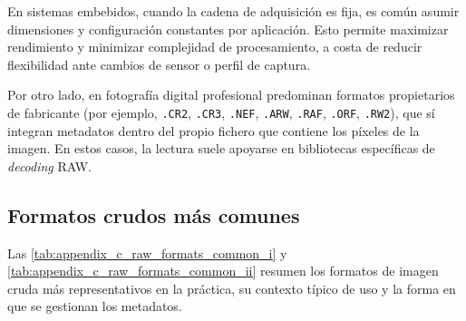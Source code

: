 En sistemas embebidos, cuando la cadena de adquisición es fija, es común
asumir dimensiones y configuración constantes por aplicación. Esto permite
maximizar rendimiento y minimizar complejidad de procesamiento, a costa de reducir
flexibilidad ante cambios de sensor o perfil de captura.

Por otro lado, en fotografía digital profesional predominan formatos propietarios
de fabricante (por ejemplo, \texttt{.CR2}, \texttt{.CR3}, \texttt{.NEF},
\texttt{.ARW}, \texttt{.RAF}, \texttt{.ORF}, \texttt{.RW2}), que sí integran
metadatos dentro del propio fichero que contiene los píxeles de la imagen. 
En estos casos, la lectura suele apoyarse en bibliotecas específicas de \textit{decoding} RAW.

\newpage

\subsection{Formatos crudos más comunes}

Las \autoref{tab:appendix_c_raw_formats_common_i} y
\autoref{tab:appendix_c_raw_formats_common_ii} resumen los formatos de imagen
cruda más representativos en la práctica, su contexto típico de uso y la forma en
que se gestionan los metadatos.

